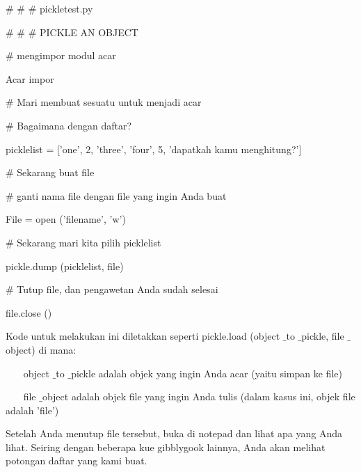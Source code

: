 \vspace{12pt}
\noindent 
$  \#  $ $  \#  $ $  \#  $ pickletest.py \par
\noindent 
$  \#  $ $  \#  $ $  \#  $ PICKLE AN OBJECT \par
\vspace{12pt}
\noindent 
$  \#  $ mengimpor modul acar \par
\noindent 
Acar impor \par
\vspace{12pt}
\noindent 
$  \#  $ Mari membuat sesuatu untuk menjadi acar \par
\noindent 
$  \#  $ Bagaimana dengan daftar? \par
\noindent 
picklelist = ['one', 2, 'three', 'four', 5, 'dapatkah kamu menghitung?'] \par
\vspace{12pt}
\noindent 
$  \#  $ Sekarang buat file \par
\noindent 
$  \#  $ ganti nama file dengan file yang ingin Anda buat \par
\noindent 
File = open ('filename', 'w') \par
\vspace{12pt}
\noindent 
$  \#  $ Sekarang mari kita pilih picklelist \par
\noindent 
pickle.dump (picklelist, file) \par
\vspace{12pt}
\noindent 
$  \#  $ Tutup file, dan pengawetan Anda sudah selesai \par
\noindent 
file.close () \par
\vspace{12pt}
\noindent 
Kode untuk melakukan ini diletakkan seperti pickle.load (object $  \_  $to $  \_  $pickle, file $  \_  $object) di mana: \par
\vspace{12pt}
\noindent 
~~~ object $  \_  $to $  \_  $pickle adalah objek yang ingin Anda acar (yaitu simpan ke file) \par
\noindent 
~~~ file $  \_  $object adalah objek file yang ingin Anda tulis (dalam kasus ini, objek file adalah 'file') \par
\vspace{12pt}
\noindent 
Setelah Anda menutup file tersebut, buka di notepad dan lihat apa yang Anda lihat. Seiring dengan beberapa kue gibblygook lainnya, Anda akan melihat potongan daftar yang kami buat. \par
\vspace{12pt}
\noindent 
